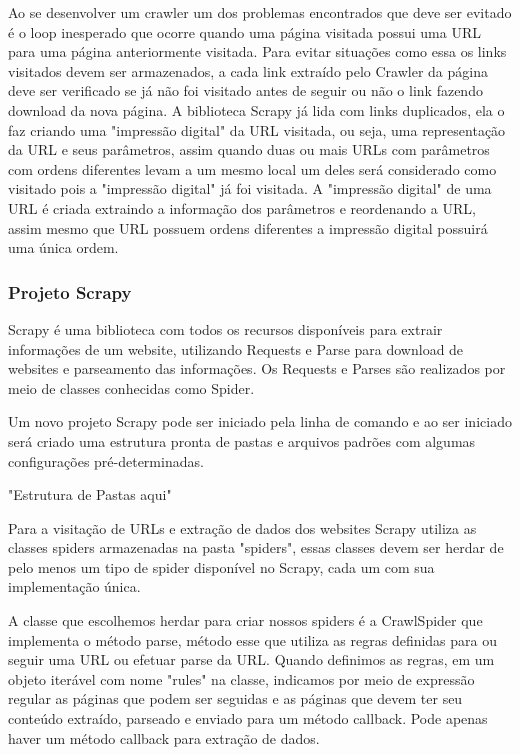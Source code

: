 \documentclass[12pt]{article}
\begin{document}
Ao se desenvolver um crawler um dos problemas encontrados que deve ser evitado é o loop inesperado que ocorre quando uma página visitada possui uma URL para uma página anteriormente visitada. Para evitar situações como essa os links visitados devem ser armazenados, a cada link extraído pelo Crawler da página deve ser verificado se já não foi visitado antes de seguir ou não o link fazendo download da nova página. 
A biblioteca Scrapy já lida com links duplicados, ela o faz criando uma "impressão digital" da URL visitada, ou seja, uma representação da URL e seus parâmetros, assim quando duas ou mais URLs com parâmetros com ordens diferentes levam a um mesmo local um deles será considerado como visitado pois a "impressão digital" já foi visitada. A "impressão digital" de uma URL é criada extraindo a informação dos parâmetros e reordenando a URL, assim mesmo que URL possuem ordens diferentes a impressão digital possuirá uma única ordem. 

\subsubsection{Projeto Scrapy}

Scrapy é uma biblioteca com todos os recursos disponíveis para extrair informações de um website, utilizando Requests e Parse para download de websites e parseamento das informações. Os Requests e Parses são realizados por meio de classes conhecidas como Spider.

Um novo projeto Scrapy pode ser iniciado pela linha de comando e ao ser iniciado será criado uma estrutura pronta de pastas e arquivos padrões com algumas configurações pré-determinadas.
 
"Estrutura de Pastas aqui"

Para a visitação de URLs e extração de dados dos websites Scrapy utiliza as classes spiders armazenadas na pasta "spiders", essas classes devem ser herdar de pelo menos um tipo de spider disponível no Scrapy, cada um com sua implementação única.

A classe que escolhemos herdar para criar nossos spiders é a CrawlSpider que implementa o método parse, método esse que utiliza as regras definidas para ou seguir uma URL ou efetuar parse da URL. Quando definimos as regras, em um objeto iterável com nome "rules" na classe, indicamos por meio de expressão regular as páginas que podem ser seguidas e as páginas que devem ter seu conteúdo extraído, parseado e enviado para um método callback. Pode apenas haver um método callback para extração de dados.
\end{document}
